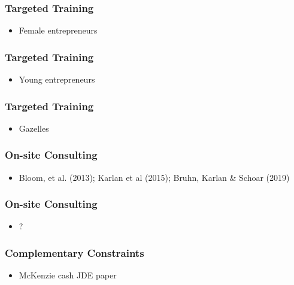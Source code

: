 \documentclass[hideothersubsections, usenames,dvipsnames,10pt]{beamer}
\begin{document}
\begin{frame}
\frametitle{Targeted Training}
	\begin{itemize}
	\item Female entrepreneurs
	\vspace{0.1in}
	\end{itemize}
\end{frame}

\begin{frame}
\frametitle{Targeted Training}
	\begin{itemize}
	\item Young entrepreneurs
	\vspace{0.1in}
	\end{itemize}
\end{frame}

\begin{frame}
\frametitle{Targeted Training}
	\begin{itemize}
	\item Gazelles
	\vspace{0.1in}
	\end{itemize}
\end{frame}


\begin{frame}
\frametitle{On-site Consulting}
	\begin{itemize}
	\item Bloom, et al. (2013); Karlan et al (2015); Bruhn, Karlan \& Schoar (2019)
	\vspace{0.1in}
	\end{itemize}
\end{frame}

\begin{frame}
\frametitle{On-site Consulting}
	\begin{itemize}
	\item ?
	\vspace{0.1in}
	\end{itemize}
\end{frame}


\begin{frame}
\frametitle{Complementary Constraints}
	\begin{itemize}
	\item McKenzie cash JDE paper
	\vspace{0.1in}
	\end{itemize}
\end{frame}
\end{document}
